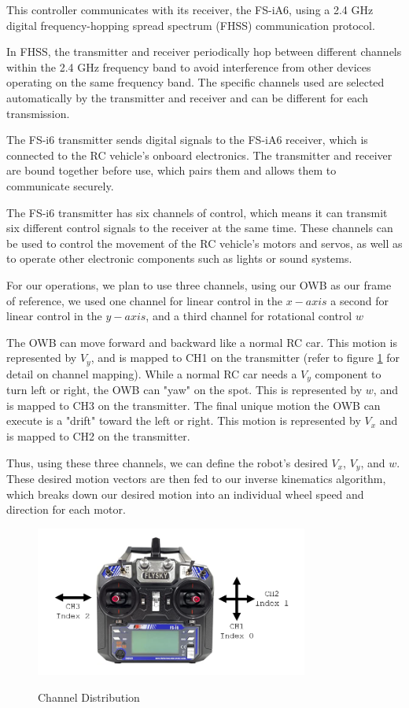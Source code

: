 \documentclass[journal,onecolumn, draftclsnofoot, 12pt]{IEEEtran}
\begin{document}
This controller communicates with its receiver, the FS-iA6, using a 2.4 GHz digital frequency-hopping spread spectrum (FHSS) communication protocol.

In FHSS, the transmitter and receiver periodically hop between different channels within the 2.4 GHz frequency band to avoid interference from other devices operating on the same frequency band. The specific channels used are selected automatically by the transmitter and receiver and can be different for each transmission.

The FS-i6 transmitter sends digital signals to the FS-iA6 receiver, which is connected to the RC vehicle's onboard electronics. The transmitter and receiver are bound together before use, which pairs them and allows them to communicate securely.

The FS-i6 transmitter has six channels of control, which means it can transmit six different control signals to the receiver at the same time. These channels can be used to control the movement of the RC vehicle's motors and servos, as well as to operate other electronic components such as lights or sound systems.

For our operations, we plan to use three channels, using our OWB as our frame of reference, we used one channel for linear control in the $x-axis$ a second for linear control in the $y-axis$, and a third channel for rotational control $w$

The OWB can move forward and backward like a normal RC car. This motion is represented by $V_y$, and is mapped to CH1 on the transmitter (refer to figure \ref{fig:ChannelDistribution} for detail on channel mapping). While a normal RC car needs a $V_y$ component to turn left or right, the OWB can "yaw" on the spot. This is represented by $w$, and is mapped to CH3 on the transmitter. The final unique motion the OWB can execute is a "drift" toward the left or right. This motion is represented by $V_x$ and is mapped to CH2 on the transmitter.

Thus, using these three channels, we can define the robot's desired $V_x$, $V_y$, and $w$. These desired motion vectors are then fed to our inverse kinematics algorithm, which breaks down our desired motion into an individual wheel speed and direction for each motor.

\begin{figure}[H]
\begin{center}
    \includegraphics[width=0.8\textwidth]{channel.png}\\
    \caption{ Channel Distribution  } 
    \label{fig:ChannelDistribution}
\end{center}
\end{figure}
\end{document}
